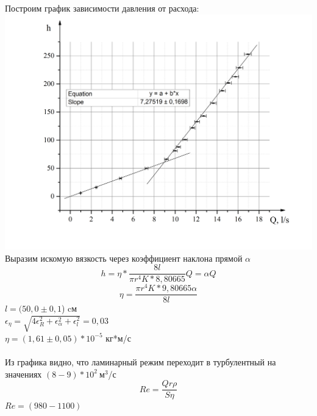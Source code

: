 \documentclass[12pt,a4paper]{article}
\begin{document}
Построим график зависимости давления от расхода:\\
\includegraphics[scale=0.7]{Graph1.jpg}
Выразим искомую вязкость через коэффициент наклона прямой $\alpha$
$$h=\eta*\frac{8l}{\pi r^4K*8,80665}Q=\alpha Q$$
$$\eta = \frac{\pi r^4 K*9,80665 \alpha}{8l}$$
$l=(50,0\pm0,1$) cм \\

$\epsilon_\eta = \sqrt{4\epsilon_R^2+\epsilon_\alpha^2+\epsilon_l^2}=0,03$\\


$\eta =(1,61\pm0,05)*10^{-5}$ кг*м/с \\ 

\ \\


Из графика видно, что ламинарный режим переходит в турбулентный на значениях $(8-9)*10^2 \ $м$^3$/с
$$Re=\frac{Qr\rho}{S\eta}$$
$Re=(980-1100)$
\end{document}
